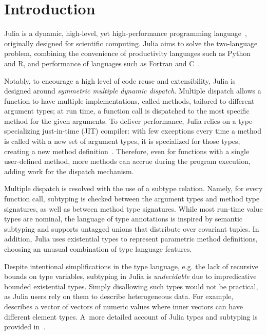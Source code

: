 \chapter{Introduction}

Julia is a dynamic, high-level, yet high-performance programming
language~\cite{bezanson:julia-fresh:2017},
originally designed for scientific computing.
Julia aims to solve the two-language problem, combining the convenience of
productivity languages such as Python and R, and performance of languages such
as Fortran and C~\cite{oopsla18a}.

Notably, to encourage a high level of code reuse and extensibility,
Julia is designed around \emph{symmetric multiple dynamic dispatch}.
Multiple dispatch allows a function to have multiple implementations, called
methods, tailored to different argument types; at run time, a function
call is dispatched to the most specific method for the given arguments.
To deliver performance, Julia relies on a type-specializing just-in-time (JIT)
compiler: with few exceptions%
every time a method is called with a new set of argument types,
it is specialized for those types, creating a new method
definition~\cite{oopsla21jules}.
Therefore, even for functions with a single user-defined method,
more methods can accrue during the program execution,
adding work for the dispatch mechanism.


Multiple dispatch is resolved with the use of a subtype relation.
Namely, for every function call, subtyping is checked between
the argument types and method type signatures,
as well as between method type signatures.
While most run-time value types are nominal,
the language of type annotations is inspired by semantic subtyping
and supports untagged unions that distribute over covariant tuples.
In addition, Julia uses existential types
to represent parametric method definitions,
choosing an unusual combination of type language features.


Despite intentional simplifications in the type language,
e.g. the lack of recursive bounds on type variables,
subtyping in Julia is \emph{undecidable} due to %
impredicative bounded existential types.
Simply disallowing such types would not be practical,
as Julia users rely on them to describe heterogeneous data.
For example, 
describes a vector of vectors of numeric values where inner vectors
can have different element types.
A~more detailed account of Julia types and subtyping
is provided in~.

